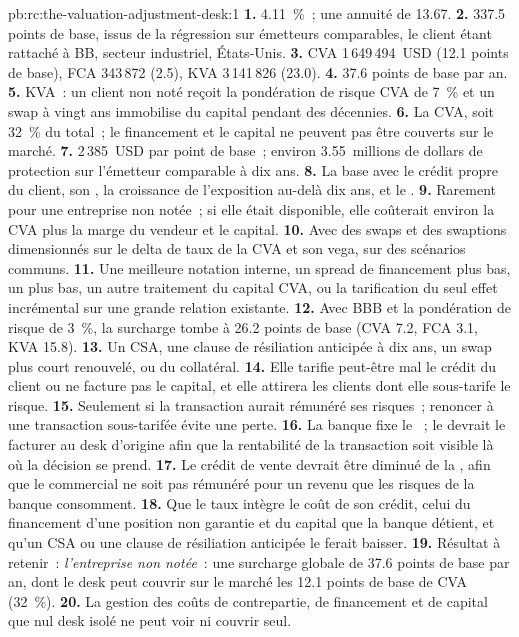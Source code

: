 \begin{solution}{pb:rc:the-valuation-adjustment-desk:1}
\textbf{1.} 4.11~\%~; une annuité de 13.67.
\textbf{2.} 337.5 points de base, issus de la régression sur émetteurs comparables, le client étant rattaché à BB,
secteur industriel, États-Unis.
\textbf{3.} CVA 1\,649\,494~USD (12.1 points de base), FCA 343\,872 (2.5), KVA 3\,141\,826 (23.0).
\textbf{4.} 37.6 points de base par an.
\textbf{5.} KVA~: un client non noté reçoit la pondération de risque CVA de 7~\% et un swap à vingt ans immobilise
du capital pendant des décennies.
\textbf{6.} La CVA, soit 32~\% du total~; le financement et le capital ne peuvent pas être couverts sur le marché.
\textbf{7.} 2\,385~USD par point de base~; environ 3.55~millions de dollars de protection sur l'émetteur comparable à dix ans.
\textbf{8.} La base avec le crédit propre du client, son , la croissance de l'exposition au-delà
dix ans, et le .
\textbf{9.} Rarement pour une entreprise non notée~; si elle était disponible, elle coûterait environ la CVA plus la
marge du vendeur et le capital.
\textbf{10.} Avec des swaps et des swaptions dimensionnés sur le delta de taux de la CVA et son vega, sur des
scénarios communs.
\textbf{11.} Une meilleure notation interne, un spread de financement plus bas, un  plus bas, un
autre traitement du capital CVA, ou la tarification du seul effet incrémental sur une grande
relation existante.
\textbf{12.} Avec BBB et la pondération de risque de 3~\%, la surcharge tombe à 26.2 points de base (CVA 7.2,
FCA 3.1, KVA 15.8).
\textbf{13.} Un CSA, une clause de résiliation anticipée à dix ans, un swap plus court renouvelé, ou du collatéral.
\textbf{14.} Elle tarifie peut-être mal le crédit du client ou ne facture pas le capital, et elle
attirera les clients dont elle sous-tarife le risque.
\textbf{15.} Seulement si la transaction aurait rémunéré ses risques~; renoncer à une
transaction sous-tarifée évite une perte.
\textbf{16.} La banque fixe le ~; le  devrait le facturer au desk d'origine afin que
la rentabilité de la transaction soit visible là où la décision se prend.
\textbf{17.} Le crédit de vente devrait être diminué de la , afin que le commercial ne soit pas rémunéré pour
un revenu que les risques de la banque consomment.
\textbf{18.} Que le taux intègre le coût de son crédit, celui du financement d'une position non garantie et
du capital que la banque détient, et qu'un CSA ou une clause de résiliation anticipée le ferait baisser.
\textbf{19.} Résultat à retenir~: \emph{l'entreprise non notée}~: une surcharge globale de 37.6 points de base par
an, dont le desk peut couvrir sur le marché les 12.1 points de base de CVA (32~\%).
\textbf{20.} La gestion des coûts de contrepartie, de financement et de capital que nul desk isolé ne peut
voir ni couvrir seul.
\end{solution}

